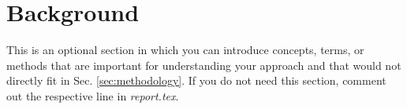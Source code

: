 \documentclass[../report.tex]{subfiles}
\begin{document}
    \section{Background}
    \label{sec:background}

    This is an optional section in which you can introduce concepts, terms, or methods that are important for understanding your approach and that would not directly fit in Sec. \ref{sec:methodology}.
    If you do not need this section, comment out the respective line in \emph{report.tex}.
\end{document}
